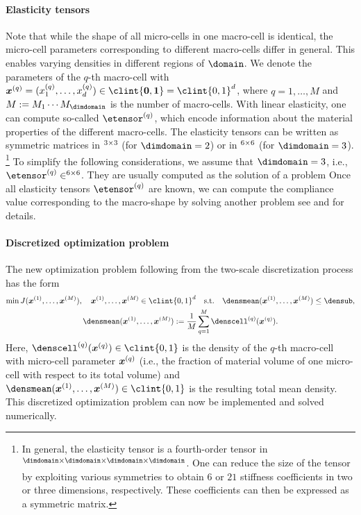 \paragraph{Elasticity tensors}

Note that while the shape of all micro-cells in one macro-cell is identical,
the micro-cell parameters corresponding to different macro-cells differ
in general.
This enables varying densities in different regions of $\domain$.
We denote the parameters of the $q$-th macro-cell
with $\*x^{(q)} = (x_1^{(q)}, \dotsc, x_d^{(q)}) \in
\clint{\*0, \*1} = \clint{0, 1}^d$,
where $q = 1, \dotsc, M$ and
$M := M_1 \dotsm M_{\dimdomain}$ is the number of macro-cells.
With linear elasticity,
one can compute so-called  $\etensor^{(q)}$,
which encode information about the material properties
of the different macro-cells.
The elasticity tensors can be written as symmetric matrices
in $\real^{3 \times 3}$ (for $\dimdomain = 2$) or
in $\real^{6 \times 6}$ (for $\dimdomain = 3$).%
\footnote{%
  In general, the elasticity tensor is a fourth-order tensor in
  $\real^{\dimdomain \times \dimdomain \times \dimdomain \times \dimdomain}$.
  One can reduce the size of the tensor by exploiting various symmetries
  \cite{Huebner14Mehrdimensionale}
  to obtain $6$ or $21$ stiffness coefficients
  in two or three dimensions, respectively.
  These coefficients can then be expressed as a symmetric matrix.%
}
To simplify the following considerations,
we assume that $\dimdomain = 3$, i.e.,
$\etensor^{(q)} \in \real^{6 \times 6}$.
They are usually computed as the solution of a \fem problem
Once all elasticity tensors $\etensor^{(q)}$ are known,
we can compute the compliance value corresponding to the macro-shape
by solving another \fem problem 
see \cite{Allaire04Topology} and \cite{Huebner14Mehrdimensionale}
for details.

\paragraph{Discretized optimization problem}

The new optimization problem following from the
two-scale discretization process has the form
\begin{subequations}
  \label{eq:topoOptProblemDiscrete}
  \begin{gather}
    \min J(\*x^{(1)}, \dotsc, \*x^{(M)}),\quad
    \*x^{(1)}, \dotsc, \*x^{(M)} \in \clint{0, 1}^d
    \quad\text{s.t.}\quad
    \densmean(\*x^{(1)}, \dotsc, \*x^{(M)}) \le \densub,\\
    \densmean(\*x^{(1)}, \dotsc, \*x^{(M)})
    := \frac{1}{M} \sum_{q=1}^M \denscell^{(q)}(\*x^{(q)}).
  \end{gather}
\end{subequations}
Here, $\denscell^{(q)}(\*x^{(q)}) \in \clint{0, 1}$ is the
density of the $q$-th macro-cell with micro-cell parameter ${\boldsymbol{x}}^{(q)}$
(i.e., the fraction of material volume of one micro-cell
with respect to its total volume)
and $\densmean(\*x^{(1)}, \dotsc, \*x^{(M)}) \in \clint{0, 1}$
is the resulting total mean density.
This discretized optimization problem can now be implemented and
solved numerically.
